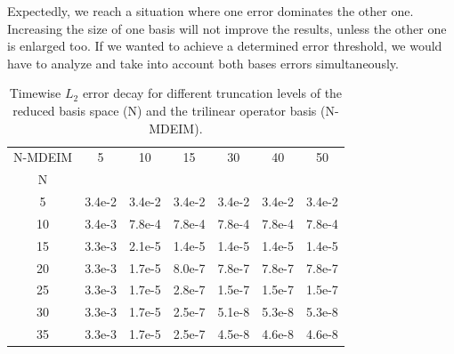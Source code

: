 \documentclass[../../thesis.tex]{subfiles}
\begin{document}
Expectedly, we reach a situation where one error dominates the other one.
Increasing the size of one basis will not improve the
results, unless the other one is enlarged too.
If we wanted to achieve a determined error threshold,
we would have to analyze and take into account both bases errors simultaneously.
\begin{table}[h]
    \centering
    \caption{Timewise $L_2$ error decay for different truncation levels 
    of the reduced basis space (N) 
    and the trilinear operator basis (N-MDEIM).}
    \begin{tabular}{ccccccc}
        \toprule
        N-MDEIM &      5  &      10 &      15 &      30 &      40 &      50 \\
        N  &         &         &         &         &         &         \\
        \midrule
        5  & 3.4e-2 & 3.4e-2 & 3.4e-2 & 3.4e-2 & 3.4e-2 & 3.4e-2 \\
        10 & 3.4e-3 & 7.8e-4 & 7.8e-4 & 7.8e-4 & 7.8e-4 & 7.8e-4 \\
        15 & 3.3e-3 & 2.1e-5 & 1.4e-5 & 1.4e-5 & 1.4e-5 & 1.4e-5 \\
        20 & 3.3e-3 & 1.7e-5 & 8.0e-7 & 7.8e-7 & 7.8e-7 & 7.8e-7 \\
        25 & 3.3e-3 & 1.7e-5 & 2.8e-7 & 1.5e-7 & 1.5e-7 & 1.5e-7 \\
        30 & 3.3e-3 & 1.7e-5 & 2.5e-7 & 5.1e-8 & 5.3e-8 & 5.3e-8 \\
        35 & 3.3e-3 & 1.7e-5 & 2.5e-7 & 4.5e-8 & 4.6e-8 & 4.6e-8 \\
        \bottomrule
    \end{tabular}
    \label{tab:nonlinear_error_decay_heatmap}
\end{table}
\end{document}
